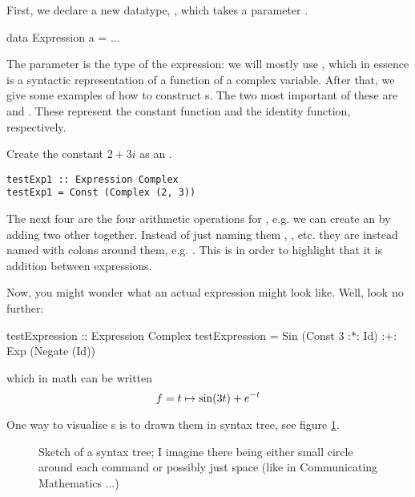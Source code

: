 First, we declare a new datatype, , which takes a parameter . 
\begin{code}
data Expression a = ...
\end{code}
The parameter is the type of the expression: we will mostly use , which in essence is a syntactic representation of a function of a complex variable.
After that, we give some examples of how to construct s. The two most important of these are  and
. These represent the constant function and the identity function,
respectively.  
\begin{example}
  Create the constant $2+3i$ as an . 
\end{example}
\begin{solution}
\begin{verbatim}
testExp1 :: Expression Complex 
testExp1 = Const (Complex (2, 3))
\end{verbatim} 
\end{solution}

The next four are the four arithmetic operations for , e.g. we can create an  by adding two other together. 
Instead of just naming them \cmd{+}, \cmd{*}, etc. they are instead named with
colons around them, e.g. \cmd{:+:}. This is in order to highlight that it is
addition between expressions.
\begin{example}
Now, you might wonder what an actual expression might look like. Well, look no further:

\begin{code}
testExpression :: Expression Complex
testExpression = Sin (Const 3 :*: Id) :+: Exp (Negate (Id))
\end{code}
  which in math can be written
\begin{equation*}
  f = t \mapsto \sin (3t) + e^{-t}
\end{equation*}
\end{example}
One way to visualise s is to drawn them in syntax tree, see figure
\ref{fig:expression-syntax-tree}. 
\begin{figure}
  \centering
  \caption{Sketch of a syntax tree; I imagine there being either small circle around each command or possibly just space (like in Communicating Mathematics ...)}
  \label{fig:expression-syntax-tree}
\end{figure}

